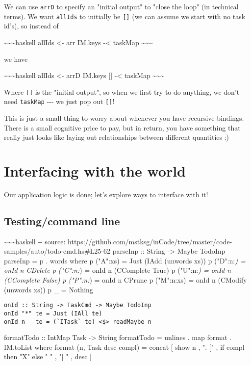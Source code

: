 \documentclass[]{article}
\begin{document}
We can use \texttt{arrD} to specify an "initial output" to "close the loop" (in
technical terms). We want \texttt{allIds} to initially be \texttt{{[}{]}} (we
can assume we start with no task id's), so instead of

\textasciitilde{}\textasciitilde{}\textasciitilde{}haskell allIds \textless{}-
arr IM.keys -\textless{} taskMap
\textasciitilde{}\textasciitilde{}\textasciitilde{}

we have

\textasciitilde{}\textasciitilde{}\textasciitilde{}haskell allIds \textless{}-
arrD IM.keys {[}{]} -\textless{} taskMap
\textasciitilde{}\textasciitilde{}\textasciitilde{}

Where \texttt{{[}{]}} is the "initial output", so when we first try to do
anything, we don't need \texttt{taskMap} -\/-\/- we just pop out
\texttt{{[}{]}}!

This is just a small thing to worry about whenever you have recursive bindings.
There is a small cognitive price to pay, but in return, you have something that
really just looks like laying out relationships between different quantities :)

\section{Interfacing with the world}

Our application logic is done; let's explore ways to interface with it!

\subsection{Testing/command line}

\textasciitilde{}\textasciitilde{}\textasciitilde{}haskell -\/- source:
https://github.com/mstksg/inCode/tree/master/code-samples/auto/todo-cmd.hs\#L25-62
parseInp :: String -\textgreater{} Maybe TodoInp parseInp = p . words where p
("A":xs) = Just (IAdd (unwords xs)) p ("D":n:\emph{) = onId n CDelete p
("C":n:}) = onId n (CComplete True) p ("U":n:\emph{) = onId n (CComplete False)
p ("P":n:}) = onId n CPrune p ("M":n:xs) = onId n (CModify (unwords xs)) p \_ =
Nothing

\begin{verbatim}
onId :: String -> TaskCmd -> Maybe TodoInp
onId "*" te = Just (IAll te)
onId n   te = (`ITask` te) <$> readMaybe n
\end{verbatim}

formatTodo :: IntMap Task -\textgreater{} String formatTodo = unlines . map
format . IM.toList where format (n, Task desc compl) = concat {[} show n , ".
{[}" , if compl then "X" else " " , "{]} " , desc {]}
\end{document}
